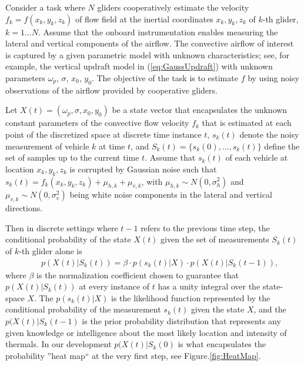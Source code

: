 \documentclass{ifacconf}
\begin{document}
Consider a task where $N$ gliders cooperatively estimate the velocity
$f_k=f(x_k,y_k,z_k)$ of flow field at the inertial coordinates $x_k,y_k,z_k$
of $k$-th glider, $k=1...N$. Assume that the onboard instrumentation enables
measuring the lateral and vertical components of the airflow. The convective
airflow of interest is captured by a given parametric model with unknown
characteristics; see, for example, the vertical updraft model in
(\ref{eq:GaussUpdraft}) with unknown parameters $\omega_p$, $\sigma$, $x_0$,
$y_0$. The objective of the task is to estimate $f$ by using noisy
observations of the airflow provided by cooperative gliders.

Let $X(t)=(\omega_p, \sigma, x_0, y_0)$ be a state vector that encapsulates
the unknown constant parameters of the convective flow velocity $f_k$ that is
estimated at each point of the discretized space at discrete time instance
$t$, $s_k(t)$ denote the noisy measurement of vehicle $k$ at time $t$, and
$S_k(t)=\{s_k(0),...,s_k(t)\}$ define the set of samples up to the current
time $t$. Assume that $s_k(t)$ of each vehicle at location $x_k,y_k,z_k$ is
corrupted by Gaussian noise such that
$s_k(t)=f_k(x_k,y_k,z_k)+\mu_{h,k}+\mu_{v,k}$, with $\mu_{h,k}\sim
N(0,\sigma^2_h)$ and $\mu_{v,k}\sim N(0,\sigma^2_v)$ being white noise
components in the lateral and vertical directions.

Then in discrete settings where $t-1$ refers to the previous time step, the
conditional probability of the state $X(t)$ given the set of measurements
$S_k(t)$ of $k$-th glider alone is
\begin{eqnarray}
    && p(X(t)\vert S_k(t))=\beta \cdot p(s_k(t) \vert X)\cdot p(X(t) \vert S_k(t-1)),
    \label{eq:BayesProb}
\end{eqnarray}
where $\beta$ is the normalization coefficient chosen to guarantee that
$p(X(t)\vert S_k(t))$ at every instance of $t$ has a unity integral over the
state-space $X$.  The $p(s_k(t) \vert X)$ is the likelihood function
represented by the conditional probability of the measurement $s_k(t)$ given
the state $X$, and the $p(X(t) \vert S_k(t-1)$ is the prior probability
distribution that represents any given knowledge or intelligence about the
most likely location and intensity of thermals. In our development $p(X(t)
\vert S_k(0)$ is what encapsulates the probability ''heat map`` at the very
first step, see Figure.\ref{fig:HeatMap}.
\end{document}
